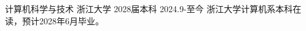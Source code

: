 
\begin{cventries}
  \cventry
    {计算机科学与技术} %
    {浙江大学} %
    {2028届本科} %
    {2024.9-至今} %
    {浙江大学计算机系本科在读，预计2028年6月毕业。}
\end{cventries}
